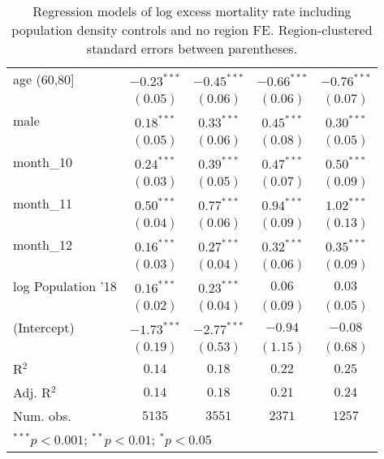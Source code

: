 \begin{table}[h!]
\begin{center}
\begin{small}
\begin{tabular}{l c c c c}
age (60,80]        & $-0.23^{***}$ & $-0.45^{***}$ & $-0.66^{***}$ & $-0.76^{***}$ \\
                   & $(0.05)$      & $(0.06)$      & $(0.06)$      & $(0.07)$      \\
male               & $0.18^{***}$  & $0.33^{***}$  & $0.45^{***}$  & $0.30^{***}$  \\
                   & $(0.05)$      & $(0.06)$      & $(0.08)$      & $(0.05)$      \\
month\_10          & $0.24^{***}$  & $0.39^{***}$  & $0.47^{***}$  & $0.50^{***}$  \\
                   & $(0.03)$      & $(0.05)$      & $(0.07)$      & $(0.09)$      \\
month\_11          & $0.50^{***}$  & $0.77^{***}$  & $0.94^{***}$  & $1.02^{***}$  \\
                   & $(0.04)$      & $(0.06)$      & $(0.09)$      & $(0.13)$      \\
month\_12          & $0.16^{***}$  & $0.27^{***}$  & $0.32^{***}$  & $0.35^{***}$  \\
                   & $(0.03)$      & $(0.04)$      & $(0.06)$      & $(0.09)$      \\
log Population '18 & $0.16^{***}$  & $0.23^{***}$  & $0.06$        & $0.03$        \\
                   & $(0.02)$      & $(0.04)$      & $(0.09)$      & $(0.05)$      \\
(Intercept)        & $-1.73^{***}$ & $-2.77^{***}$ & $-0.94$       & $-0.08$       \\
                   & $(0.19)$      & $(0.53)$      & $(1.15)$      & $(0.68)$      \\
\hline
R$^2$              & $0.14$        & $0.18$        & $0.22$        & $0.25$        \\
Adj. R$^2$         & $0.14$        & $0.18$        & $0.21$        & $0.24$        \\
Num. obs.          & $5135$        & $3551$        & $2371$        & $1257$        \\
\hline
\multicolumn{5}{l}{\tiny{$^{***}p<0.001$; $^{**}p<0.01$; $^{*}p<0.05$}}
\end{tabular}
\end{small}
\caption{Regression models of log excess mortality rate including population density controls and no region FE. Region-clustered standard errors between parentheses.}
\label{tab:popdensmodels}
\end{center}
\end{table}
